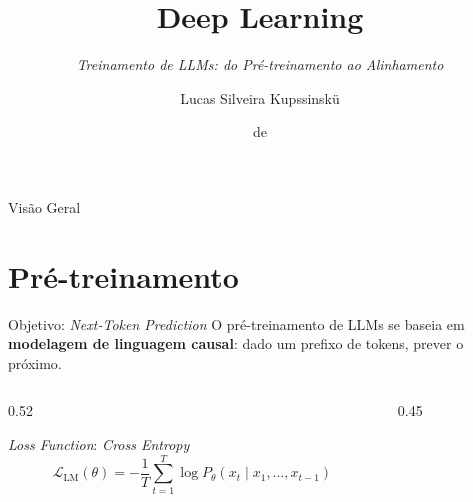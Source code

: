 \documentclass[aspectratio=169, xcolor=dvipsnames]{beamer}
\title{Deep Learning}
\subtitle{\textit{Treinamento de LLMs: do Pré-treinamento ao Alinhamento}}
\author{Lucas Silveira Kupssinskü}
\institute
{ Machine Learning Theory and Applications Laboratory \\ PUCRS
}
\date{\mespor de \the\year}
\begin{document}
  \begin{frame}
    \titlepage
  \end{frame}

  \begin{frame}{Visão Geral}
    \tableofcontents
  \end{frame}

  \section{Pré-treinamento}

  \begin{frame}{Objetivo: \textit{Next-Token Prediction}}
          O pré-treinamento de LLMs se baseia em \textbf{modelagem de linguagem causal}:
        dado um prefixo de tokens, prever o próximo.
    \begin{columns}
      \begin{column}{0.52\textwidth}

        \begin{block}{\textit{Loss Function}: \textit{Cross Entropy}}
          \[
            \mathcal{L}_{\text{LM}}(\theta) = -\frac{1}{T}\sum_{t=1}^{T}
            \log P_\theta(x_t \mid x_1, \ldots, x_{t-1})
          \]
        \end{block}

      \end{column}
      \begin{column}{0.45\textwidth}


        \centering


      \end{column}
    \end{columns}
    \vspace{1em}
    

\end{frame}
\end{document}
